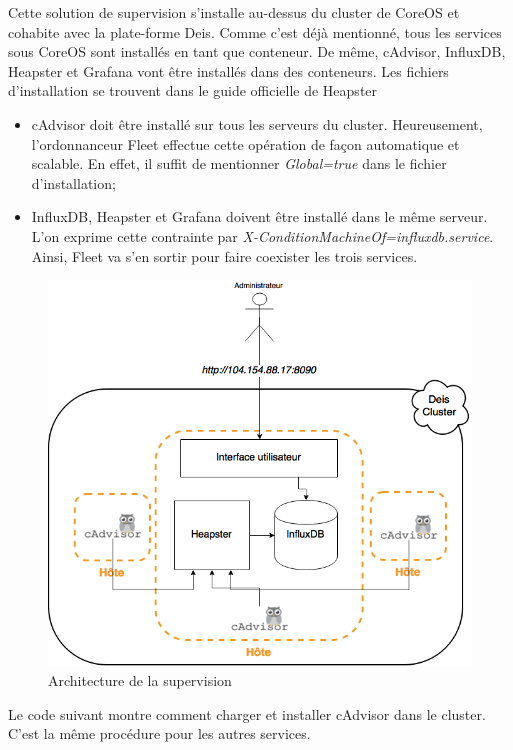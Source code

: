 \begin{onehalfspace}
Cette solution de supervision s'installe au-dessus du cluster de CoreOS et cohabite avec la plate-forme Deis. Comme c'est déjà mentionné, tous les services sous CoreOS sont installés en tant que conteneur. De même, cAdvisor, InfluxDB, Heapster et Grafana vont être installés dans des conteneurs.
Les fichiers d'installation se trouvent dans le guide officielle de Heapster \cite{heapster-coreos}

\begin{itemize}
	\item cAdvisor doit être installé sur tous les serveurs du cluster. Heureusement, l'ordonnanceur Fleet effectue cette opération de façon automatique et scalable. En effet, il suffit de mentionner \emph{Global=true} dans le fichier d'installation;
	\item InfluxDB, Heapster et Grafana doivent être installé dans le même serveur. L'on exprime cette contrainte par \emph{X-ConditionMachineOf=influxdb.service}. Ainsi, Fleet va s'en sortir pour faire coexister les trois services.
\end{itemize}

\begin{figure}[H]
\centering
\includegraphics [scale=0.6]{chapitre5/assets/monitoring-cluster}
\caption{Architecture de la supervision}
\label{fig:}
\end{figure}

Le code suivant montre comment charger et installer cAdvisor dans le cluster. C'est la même procédure pour les autres services.


\end{onehalfspace}
